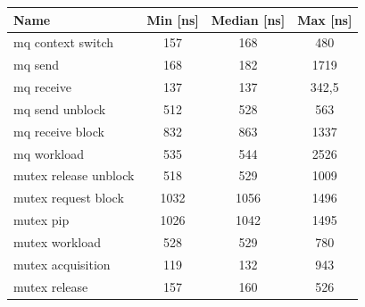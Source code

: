 \documentclass[conference]{IEEEtran}
\begin{document}
\begin{table}[htbp]
\begin{center}
\begin{tabular}{|l|c|c|c|}
\hline
\textbf{Name}           & \multicolumn{1}{l|}{\textbf{Min [ns]}} & \multicolumn{1}{l|}{\textbf{Median [ns]}} & \multicolumn{1}{l|}{\textbf{Max [ns]}} \\ \hline
mq context switch       & 157                                    & 168                                       & 480                                    \\ \hline
mq send                 & 168                                    & 182                                       & 1719                                   \\ \hline
mq receive              & \cellcolor[HTML]{C3D3D5}137            & \cellcolor[HTML]{C3D3D5}137               & 342,5                                  \\ \hline
mq send unblock       & 512                                    & 528                                       & 563                                    \\ \hline
mq receive block        & 832                                    & \cellcolor[HTML]{C3D3D5} 863               & 1337                                   \\ \hline
mq workload             & 535                                    & 544                                       & \cellcolor[HTML]{C3D3D5}2526           \\ \hline
mutex release unblock   & 518                                    & 529                                       & 1009                                   \\ \hline
mutex request block     & 1032                                   & 1056                                      & 1496                                   \\ \hline
mutex pip               & 1026           & 1042              & 1495                                   \\ \hline
mutex workload          & 528                                    & 529                                       & 780                                    \\ \hline
mutex acquisition       & 119                                    & 132               & 943                                    \\ \hline
mutex release           & 157                                    & 160                                       & 526                                    \\ \hline


\end{tabular}
\end{center}
\end{table}
\end{document}
